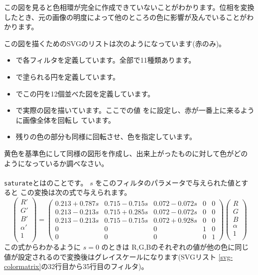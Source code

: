 この図を見ると色相環が完全に作成できていないことがわかります。位相を変換
したとき、元の画像の明度によって他のところの色に影響が及んでいることがわ
かります。

この図を描くためのSVGのリストは次のようになっています(赤のみ)。

{}
\begin{itemize}
 \item {}で各フィルタを定義しています。全部で11種類あります。
 \item {}で塗られる円を定義しています。
 \item {}でこの円を12個並べた図を定義しています。
 \item {}で実際の図を描いています。ここでの値
       をに設定し、赤が一番上に来るように画像全体を回転し
       ています。
 \item 残りの色の部分も同様に回転させ、色を指定しています。
\end{itemize}
\begin{Problem}
 黄色を基準色にして同様の図形を作成し、出来上がったものに対して色がどの
 ようになっているか調べなさい。
\end{Problem}
\paragraph{}
\texttt{saturate}とはのことです。
$s$ をこのフィルタのパラメータで与えられた値とすると
この変換は次の式で与えられます。
\[
 \left(\begin{array}{c}
  R'\\G'\\B'\\\alpha'\\1\\
       \end{array}\right)=
\left(\begin{array}{ccccc}
0.213+0.787s&  0.715-0.715s&  0.072-0.072s& 0 & 0\\
0.213-0.213s&  0.715+0.285s&  0.072-0.072s& 0 & 0\\
0.213-0.213s&  0.715-0.715s&  0.072+0.928s& 0 & 0\\
     0      &         0    &       0      & 1 & 0 \\
     0      &         0    &       0      & 0 & 1
      \end{array}\right)
 \left(\begin{array}{c}
  R\\G\\B\\\alpha\\1\\
       \end{array}\right)
\]
この式からわかるように $s=0$ のときは R,G,Bのそれぞれの値が他の色に同じ
値が設定されるので変換後はグレイスケールになります(SVGリスト
\ref{svg-colormatrix}の32行目から35行目のフィルタ)。

